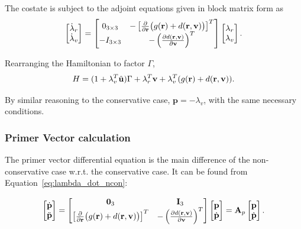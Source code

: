 The costate is subject to the adjoint equations given in block matrix form as
\begin{equation}\label{eq:lambda_dot_ncon}
    \begin{bmatrix}
        \dot{\mathbf{\lambda}}_r \\ \dot{\mathbf{\lambda}}_v
    \end{bmatrix} = \begin{bmatrix}
        0_{3\times3} & -\left[\frac{\partial }{\partial \mathbf{r}}\big(g(\mathbf{r}) + d(\pos, \vel)\big)\right]^T \\
        -I_{3\times3} & -\left(\frac{\partial d(\pos, \vel)}{\partial \vel}\right)^T 
    \end{bmatrix} \begin{bmatrix}
        \mathbf{\lambda}_r \\ \mathbf{\lambda}_v
    \end{bmatrix}.
\end{equation}

Rearranging the Hamiltonian to factor \(\Gamma \), 
\begin{equation}
    H = (1 + \mathbf{\lambda}_v^T \hat{\mathbf{u}}) \Gamma + \mathbf{\lambda}_r^T \mathbf{v} + \mathbf{\lambda}_v^T (g(\mathbf{r}) + d(\mathbf{r}, \mathbf{v})).
\end{equation}

By similar reasoning to the conservative case, \(\mathbf{p} = - \lambda_v\), with the same necessary conditions. 

\subsubsection{Primer Vector calculation}\label{sssec:pv_calc_ncon}

The primer vector differential equation is the main difference of the non-conservative case w.r.t. the conservative case. It can be found from Equation~\eqref{eq:lambda_dot_ncon}:

\begin{equation}\label{eq:pdot_ncon}
    \begin{bmatrix}
        \dot{\mathbf{p}} \\ \ddot{\mathbf{p}}
    \end{bmatrix} = \begin{bmatrix}
        \mathbf{0}_3 & \mathbf{I}_3 \\
        \left[\frac{\partial }{\partial \mathbf{r}}\big(g(\mathbf{r}) + d(\pos, \vel)\big)\right]^T & -\left(\frac{\partial d(\pos, \vel)}{\partial \vel}\right)^T
    \end{bmatrix} \begin{bmatrix}
        \mathbf{p} \\ \dot{\mathbf{p}}
    \end{bmatrix} = \mathbf{A}_p \begin{bmatrix}
        \mathbf{p} \\ \dot{\mathbf{p}}
    \end{bmatrix}.
\end{equation}

